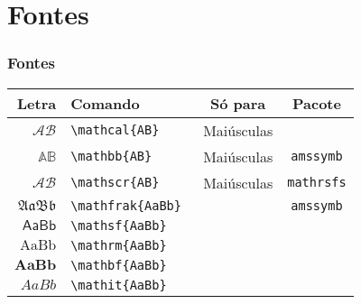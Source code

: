 \documentclass[brazilian]{beamer}
\begin{document}
\section{Fontes}
\begin{frame}[fragile]
    \frametitle{Fontes}

    \begin{table}
        \begin{tabular}{rlcc}
            Letra & Comando & Só para & Pacote\\ \hline
            \(\mathcal{AB} \) & \lstinline[style=myStyleLatex]!\mathcal{AB} ! & Maiúsculas & \\ \hline
            \(\mathbb{AB} \) & \lstinline[style=myStyleLatex]!\mathbb{AB} ! & Maiúsculas & \texttt{amssymb} \\ \hline
            \(\mathscr{AB}\) & \lstinline[style=myStyleLatex]!\mathscr{AB}! & Maiúsculas & \texttt{mathrsfs} \\ \hline
            \(\mathfrak{AaBb} \) & \lstinline[style=myStyleLatex]!\mathfrak{AaBb} ! & & \texttt{amssymb}\\ \hline
            \(\mathsf{AaBb} \) & \lstinline[style=myStyleLatex]!\mathsf{AaBb} ! & & \\ \hline
            \(\mathrm{AaBb} \) & \lstinline[style=myStyleLatex]!\mathrm{AaBb} ! & & \\ \hline
            \(\mathbf{AaBb} \) & \lstinline[style=myStyleLatex]!\mathbf{AaBb} ! & & \\ \hline
            \(\mathit{AaBb}\) & \lstinline[style=myStyleLatex]!\mathit{AaBb} ! & & \\ \hline            
        \end{tabular}
    \end{table}

\end{frame}
\end{document}
